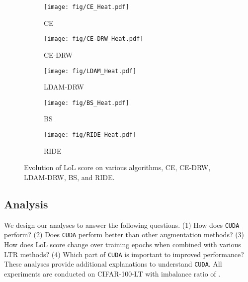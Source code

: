 \documentclass{article}
\def\code#1{\texttt{#1}}
\newcommand{\alg}{\code{CUDA}\xspace}
\begin{document}
%
 
\begin{figure}[!t]
  \centering
  \begin{subfigure}{0.195\linewidth}
          \texttt{[image: fig/CE\_Heat.pdf]}
          \vspace{-16pt}
          \caption{CE}
  \end{subfigure}
\begin{subfigure}{0.195\linewidth}
          \texttt{[image: fig/CE-DRW\_Heat.pdf]}
          \vspace{-16pt}
          \caption{CE-DRW}
  \end{subfigure}
  \begin{subfigure}{0.195\linewidth}
          \texttt{[image: fig/LDAM\_Heat.pdf]}
          \vspace{-16pt}
          \caption{LDAM-DRW}
  \end{subfigure}
\begin{subfigure}{0.195\linewidth}
          \texttt{[image: fig/BS\_Heat.pdf]}
          \vspace{-16pt}
          \caption{BS}
  \end{subfigure}
\begin{subfigure}{0.195\linewidth}
          \texttt{[image: fig/RIDE\_Heat.pdf]}
          \vspace{-16pt}
          \caption{RIDE}
  \end{subfigure}
  \vspace{-7pt}
  \caption{Evolution of LoL score on various algorithms, CE, CE-DRW, LDAM-DRW, BS, and RIDE.  }
  \label{fig:curriculum}
  \vspace{-15pt}
\end{figure}
 
\vspace{-2pt}
\subsection{Analysis}\label{exp:analysis}
\vspace{-2pt}
We design our analyses to answer the following questions. (1) How does \alg perform? (2) Does \alg perform better than other augmentation methods? (3) How does LoL score change over training epochs when combined with various LTR methods? (4) Which part of \alg is important to improved performance? These analyses provide additional explanations to understand \alg. All experiments are conducted on CIFAR-100-LT with imbalance ratio of .
\end{document}
